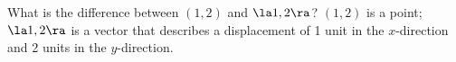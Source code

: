 {What is the difference between $(1,2)$ and $\la 1,2\ra$?
}
{$(1,2)$ is a point; $\la 1,2\ra$ is a vector that describes a displacement of 1 unit in the $x$-direction and 2 units in the $y$-direction.
}
